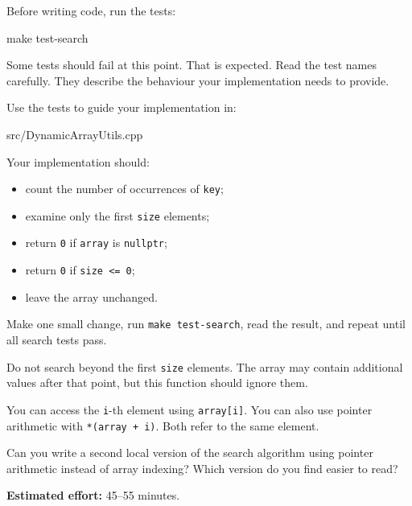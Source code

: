 \documentclass{csc2059practical}
\begin{document}
Before writing code, run the tests:

\begin{bashcode}
make test-search
\end{bashcode}

Some tests should fail at this point. That is expected. Read the test names carefully. They describe the behaviour your implementation needs to provide.

Use the tests to guide your implementation in:

\begin{terminal}
src/DynamicArrayUtils.cpp
\end{terminal}

Your implementation should:
\begin{itemize}
  \item count the number of occurrences of \texttt{key};
  \item examine only the first \texttt{size} elements;
  \item return \texttt{0} if \texttt{array} is \texttt{nullptr};
  \item return \texttt{0} if \texttt{size <= 0};
  \item leave the array unchanged.
\end{itemize}

Make one small change, run \texttt{make test-search}, read the result, and repeat until all search tests pass.

\begin{commonerror}
Do not search beyond the first \texttt{size} elements. The array may contain additional values after that point, but this function should ignore them.
\end{commonerror}

\begin{tipbox}
You can access the \texttt{i}-th element using \texttt{array[i]}. You can also use pointer arithmetic with \texttt{*(array + i)}. Both refer to the same element.
\end{tipbox}

\begin{challengebox}
Can you write a second local version of the search algorithm using pointer arithmetic instead of array indexing? Which version do you find easier to read?
\end{challengebox}


\begin{infobox}
\textbf{Estimated effort:} 45--55 minutes.
\end{infobox}
\end{document}
